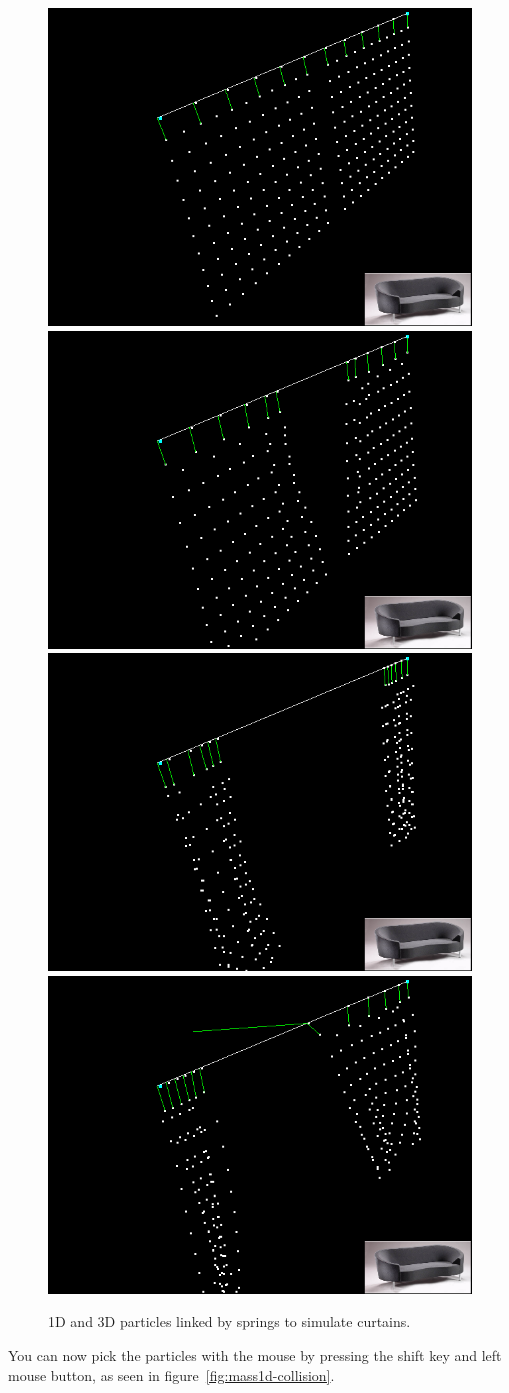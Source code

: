 \begin{figure}
\includegraphics[width=0.5\linewidth]{fig/mass1d-curtain1}\includegraphics[width=0.5\linewidth]{fig/mass1d-curtain2}\\
\includegraphics[width=0.5\linewidth]{fig/mass1d-curtain3}\includegraphics[width=0.5\linewidth]{fig/mass1d-curtain4}%
\caption{1D and 3D particles linked by springs to simulate curtains.}\label{fig:mass1d-curtain}
\end{figure}

You can now pick the particles with the mouse by pressing the shift key and left mouse button, as seen in figure~\ref{fig:mass1d-collision}.


